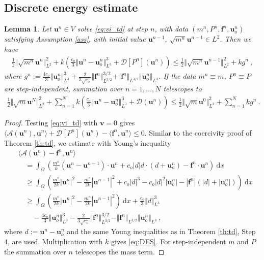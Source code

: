 \documentclass{article}
\newtheorem{lemma}[theorem]{Lemma}
\theoremstyle{definition}
\newcommand{\bfu}{\boldsymbol{u}}
\newcommand{\bfv}{\boldsymbol{v}}
\newcommand{\bff}{\boldsymbol{f}}
\newcommand{\D}{\mathcal{D}}
\newcommand{\dd}{\:\mathrm{d}}
\begin{document}
\subsection{Discrete energy estimate}
\begin{lemma}\label{lem:DES}
    Let $\bfu^{n}\in V$ solve \eqref{eq:vi_td} at step $n$, with data
    $(m^n, P^n, \bff^{n}, \bfu^{n}_o)$ satisfying Assumption \ref{ass}, with initial value $\bfu^{n-1}$,
    $\sqrt{m^n}\bfu^{n-1}\in L^{2}$. Then we have
    \begin{align}
        \frac{1}{2} \Vert \sqrt{m^n}\bfu^{n}\Vert^{2}_{L^{2}} +
        k \left(\frac{c_o}{3}\Vert\bfu^n-\bfu^n_o\Vert^3_{L^3} + \D[P^n](\bfu^n)\right)
        \leq \frac{1}{2} \Vert \sqrt{m^n}\bfu^{n-1}\Vert^{2}_{L^{2}} + k g^n \ , \label{eq:DES}
    \end{align}
    where $g^n := \frac{4c_o}{3} \Vert \bfu^n_o\Vert^3_{L^3} + \frac{2}{3\sqrt{c_o}} \Vert \bff^n\Vert_{L^{3/2}}^{3/2}
    +\Vert\bff^n\Vert_{L^{3/2}}\Vert \bfu^n_o\Vert_{L^3}$. If the data $m^n \equiv m$, $P^n\equiv P$ are step-independent, summation over $n=1,\dots,N$ telescopes to
    \begin{align*}
        \frac{1}{2} \Vert \sqrt{m}\bfu^{N}\Vert^{2}_{L^{2}} +
        \sum_{n=1}^N k \left(\frac{c_o}{3}\Vert\bfu^n-\bfu^n_o\Vert^3_{L^3} + \D(\bfu^n)\right)
        \leq \frac{1}{2} \Vert \sqrt{m}\bfu^{0}\Vert^{2}_{L^{2}} + \sum_{n=1}^N k g^n \ .
    \end{align*}
\end{lemma}
\begin{proof}
    Testing \eqref{eq:vi_td} with $\bfv =0$ gives $\langle \mathcal{A}(\bfu^{n}),\bfu^n\rangle + \D[P^n](\bfu^n)-\langle \bff^n, \bfu^n\rangle \leq 0$. Similar to the coercivity proof of Theorem \ref{th:td}, we estimate with
    Young's inequality
    \begin{align*}
        &\langle \mathcal{A} (\bfu^{n}) - \bff^n , \bfu^n \rangle\\
        &\quad= \int_\Omega \left(\frac {m^n} k (\bfu^n-\bfu^{n-1})\cdot \bfu^n + c_o |d| d\cdot(d+\bfu^n_o)-\bff^n \cdot \bfu^n\right) \dd x\\
        &\quad\geq \int_\Omega \left(\frac{m^n}{2k} |\bfu^n|^{2} - \frac{m^n}{2k}|\bfu^{n-1}|^{2} + c_o |d|^3 - c_o |d|^2|\bfu^n_o|
        -|\bff^n|(|d|+|\bfu^n_o|)\right) \dd x\\
        &\quad\geq \int_\Omega \left(\frac{m^n}{2k} |\bfu^n|^{2} - \frac{m^n}{2k}|\bfu^{n-1}|^{2}\right) \dd x
        +\frac{c_o}{3} \Vert d \Vert^3_{L^3}\\
        &\qquad - \frac{4c_o}{3} \Vert \bfu^n_o\Vert^3_{L^3} - \frac{2}{3\sqrt{c_o}} \Vert \bff^n\Vert_{L^{3/2}}^{3/2}
        -\Vert\bff^n\Vert_{L^{3/2}}\Vert \bfu^n_o\Vert_{L^3} \ ,
    \end{align*}
    where $d := \bfu^n -\bfu^n_o$ and the same Young inequalities as in Theorem \ref{th:td}, Step 4, are used. Multiplication with $k$ gives \eqref{eq:DES}. For step-independent $m$ and $P$ the summation over $n$ telescopes the mass term.
\end{proof}
\end{document}
